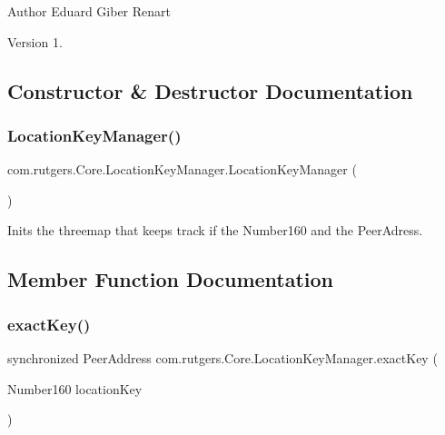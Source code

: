 \begin{DoxyAuthor}{Author}
Eduard Giber Renart 
\end{DoxyAuthor}
\begin{DoxyVersion}{Version}
1. 
\end{DoxyVersion}


\subsection{Constructor \& Destructor Documentation}
\mbox{\label{classcom_1_1rutgers_1_1Core_1_1LocationKeyManager_a5b4af0b9881a71b555537e891e27417b}} 
\subsubsection{\texorpdfstring{Location\+Key\+Manager()}{LocationKeyManager()}}
{\footnotesize\ttfamily com.\+rutgers.\+Core.\+Location\+Key\+Manager.\+Location\+Key\+Manager (\begin{DoxyParamCaption}{ }\end{DoxyParamCaption})}

Inits the threemap that keeps track if the Number160 and the Peer\+Adress. 

\subsection{Member Function Documentation}
\mbox{\label{classcom_1_1rutgers_1_1Core_1_1LocationKeyManager_ae177e62fd90497f20e2c068e236cf95d}} 
\subsubsection{\texorpdfstring{exact\+Key()}{exactKey()}}
{\footnotesize\ttfamily synchronized Peer\+Address com.\+rutgers.\+Core.\+Location\+Key\+Manager.\+exact\+Key (\begin{DoxyParamCaption}\item[{Number160}]{location\+Key }\end{DoxyParamCaption})}

